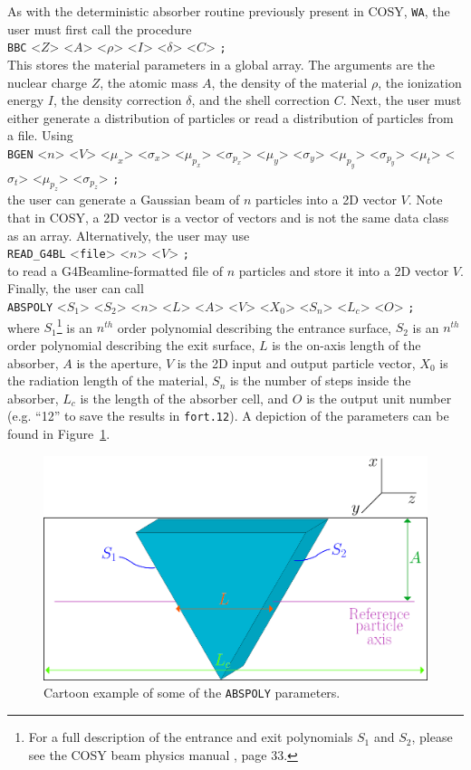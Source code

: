 As with the deterministic absorber routine previously present in COSY, \texttt{WA}, the user must first call the procedure\\
\texttt{BBC} <$Z$> <$A$> <$\rho$> <$I$> <$\delta$> <$C$> \texttt{;} \\
This stores the material parameters in a global array. The arguments are the nuclear charge $Z$, the atomic mass $A$, the density of the material $\rho$, the ionization energy $I$, the density correction $\delta$, and the shell correction $C$. Next, the user must either generate a distribution of particles or read a distribution of particles from a file. Using \\
\texttt{BGEN} <$n$> <$V$> <$\mu_x$> <$\sigma_x$> <$\mu_{p_x}$> <$\sigma_{p_x}$> <$\mu_y$> <$\sigma_y$> <$\mu_{p_y}$> <$\sigma_{p_y}$> <$\mu_t$> <$\sigma_t$> <$\mu_{p_z}$> <$\sigma_{p_z}$> \texttt{;}\\
the user can generate a Gaussian beam of $n$ particles into a 2D vector $V$. Note that in COSY, a 2D vector is a vector of vectors and is not the same data class as an array. Alternatively, the user may use \\
\verb|READ_G4BL| <\texttt{file}> <$n$> <$V$> \texttt{;}\\
to read a G4Beamline-formatted file of $n$ particles and store it into a 2D vector $V$. Finally, the user can call\\
\texttt{ABSPOLY} <$S_1$> <$S_2$> <$n$> <$L$> <$A$> <$V$> <$X_0$> <$S_n$> <$L_c$> <$O$> \texttt{;}\\
where $S_1$\footnote{For a full description of the entrance and exit polynomials $S_1$ and $S_2$, please see the COSY beam physics manual \cite{cosy}, page 33.} is an $n^{th}$ order polynomial describing the entrance surface, $S_2$ is an $n^{th}$ order polynomial describing the exit surface, $L$ is the on-axis length of the absorber, $A$ is the aperture, $V$ is the 2D input and output particle vector, $X_0$ is the radiation length of the material, $S_n$ is the number of steps inside the absorber, $L_c$ is the length of the absorber cell, and $O$ is the output unit number (e.g. ``12'' to save the results in \texttt{fort.12}). A depiction of the parameters can be found in Figure~\ref{fig:abspoly}.

\begin{figure}[!htb]
  \centering
    \includegraphics[width=\textwidth]{Figures/abspoly} 
  \caption{Cartoon example of some of the \texttt{ABSPOLY} parameters.}
  \label{fig:abspoly}
\end{figure}

